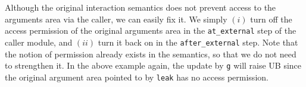 Although the original interaction semantics does not prevent access to
the arguments area via the caller, we can easily fix it.
We simply $(i)$ turn off the access
permission of the original arguments area in the \texttt{at\_external}
step of the caller module, and $(ii)$ turn it back on in the
\texttt{after\_external} step. Note that the notion of permission
already exists in the \cc{} semantics, so that we do not
need to strengthen it. In the above example again,
the update by \texttt{g} will raise UB since the original argument area pointed
to by \texttt{leak} has no access permission.






